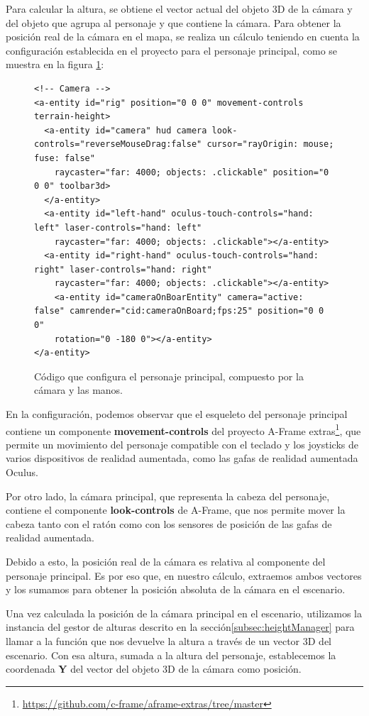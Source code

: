 \documentclass[a4paper, 11pt]{book}
\begin{document}
Para calcular la altura, se obtiene el vector actual del objeto 3D de la cámara y del objeto que agrupa al personaje y que contiene la cámara. Para obtener la posición real de la cámara en el mapa, se realiza un cálculo teniendo en cuenta la configuración establecida en el proyecto para el personaje principal, como se muestra en la figura \ref{codigo:rig}:
\begin{figure}[h]
\centering
\begin{verbatim}
<!-- Camera -->
<a-entity id="rig" position="0 0 0" movement-controls terrain-height>
  <a-entity id="camera" hud camera look-controls="reverseMouseDrag:false" cursor="rayOrigin: mouse; fuse: false"
    raycaster="far: 4000; objects: .clickable" position="0 0 0" toolbar3d>
  </a-entity>
  <a-entity id="left-hand" oculus-touch-controls="hand: left" laser-controls="hand: left"
    raycaster="far: 4000; objects: .clickable"></a-entity>
  <a-entity id="right-hand" oculus-touch-controls="hand: right" laser-controls="hand: right"
    raycaster="far: 4000; objects: .clickable"></a-entity>
    <a-entity id="cameraOnBoarEntity" camera="active: false" camrender="cid:cameraOnBoard;fps:25" position="0 0 0"
    rotation="0 -180 0"></a-entity>
</a-entity>
\end{verbatim}
\caption{Código que configura el personaje principal, compuesto por la cámara y las manos.
\label{codigo:rig}
}
\end{figure}
En la configuración, podemos observar que el esqueleto del personaje principal contiene un componente \textbf{movement-controls} del proyecto A-Frame extras\footnote{\url{https://github.com/c-frame/aframe-extras/tree/master}}, que permite un movimiento del personaje compatible con el teclado y los joysticks de varios dispositivos de realidad aumentada, como las gafas de realidad aumentada Oculus.

Por otro lado, la cámara principal, que representa la cabeza del personaje, contiene el componente \textbf{look-controls} de A-Frame, que nos permite mover la cabeza tanto con el ratón como con los sensores de posición de las gafas de realidad aumentada.

Debido a esto, la posición real de la cámara es relativa al componente del personaje principal. Es por eso que, en nuestro cálculo, extraemos ambos vectores y los sumamos para obtener la posición absoluta de la cámara en el escenario.

Una vez calculada la posición de la cámara principal en el escenario, utilizamos la instancia del gestor de alturas descrito en la sección\ref{subsec:heightManager} para llamar a la función que nos devuelve la altura a través de un vector 3D del escenario. Con esa altura, sumada a la altura del personaje, establecemos la coordenada \textbf{Y} del vector del objeto 3D de la cámara como posición.
\end{document}
